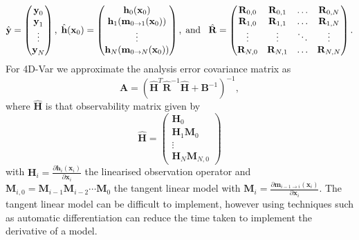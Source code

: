 \begin{equation}
\hat{\textbf{y}} =
\begin{pmatrix}
\textbf{y}_0 \\
\textbf{y}_1\\
\vdots \\
\textbf{y}_N
\end{pmatrix},
\hspace{1mm}
\hat{\textbf{h}}(\textbf{x}_0)=
\begin{pmatrix}
\textbf{h}_0(\textbf{x}_0) \\
\textbf{h}_1(\textbf{m}_{0\rightarrow 1}(\mathbf{x}_{0}))\\
\vdots \\
\textbf{h}_N(\textbf{m}_{0\rightarrow N}(\mathbf{x}_{0}))
\end{pmatrix}, \\
\hspace{1mm} \text{and} \hspace{3mm}
\hat{\mathbf{R}} =
\begin{pmatrix}
\mathbf{R}_{0, 0} & \mathbf{R}_{0, 1} & \dots & \mathbf{R}_{0, N} \\
\mathbf{R}_{1, 0} & \mathbf{R}_{1, 1} & \dots & \mathbf{R}_{1, N} \\
\vdots & \vdots & \ddots & \vdots \\
\mathbf{R}_{N, 0} & \mathbf{R}_{N, 1} & \dots & \mathbf{R}_{N, N}
\end{pmatrix}.
\end{equation}
For 4D-Var we approximate the analysis error covariance matrix as
\begin{equation}
\textbf{A} = (\hat{\textbf{H}}^{T}\hat{\textbf{R}}^{-1}\hat{\textbf{H}}+\textbf{B}^{-1})^{-1}, \label{eqn:a_cov_4dvar}
\end{equation}
where \(\hat{\textbf{H}}\) is that observability matrix given by
\begin{equation}
\hat{\mathbf{H}}=
\begin{pmatrix}
\mathbf{H}_0 \\
\mathbf{H}_1\mathbf{M}_0\\
\vdots \\
\mathbf{H}_N\mathbf{M}_{N,0}
\end{pmatrix}
\end{equation}
with $\textbf{H}_i = \frac{\partial \textbf{h}_i(\textbf{x}_i)}{\partial\textbf{x}_i}$ the linearised observation operator and $\mathbf{M}_{i,0}=\mathbf{M}_{i-1}\mathbf{M}_{i-2}\cdots\mathbf{M}_0$ the tangent linear model with $\mathbf{M}_i=\frac{\partial \textbf{m}_{i-1\rightarrow i}(\textbf{x}_{i})}{\partial \textbf{x}_{i}}$. The tangent linear model can be difficult to implement, however using techniques such as automatic differentiation \citep{renaud1997automatic} can reduce the time taken to implement the derivative of a model. 

